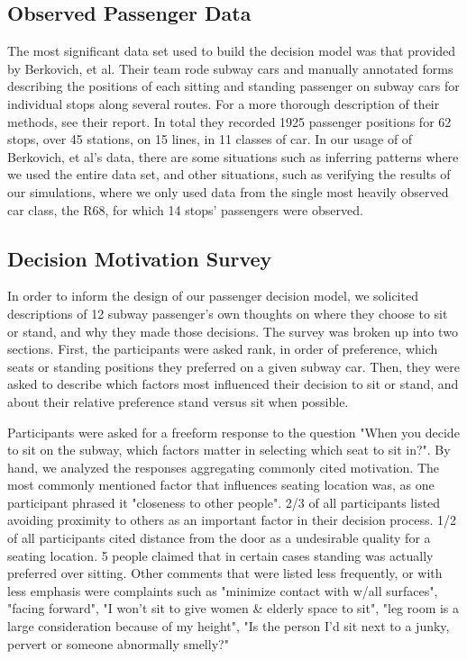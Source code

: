 \documentclass{acm_proc_article-sp}
\begin{document}
\subsection{Observed Passenger Data}
The most significant data set used to build the decision model was that provided by Berkovich, et al. Their team rode subway cars and manually annotated forms describing the positions of each sitting and standing passenger on subway cars for individual stops along several routes. For a more thorough description of their methods, see their report\cite{berkovich2013observed}. In total they recorded 1925 passenger positions for 62 stops, over 45 stations, on 15 lines, in 11 classes of car. In our usage of of Berkovich, et al's data, there are some situations such as inferring patterns where we used the entire data set, and other situations, such as verifying the results of our simulations, where we only used data from the single most heavily observed car class, the R68, for which 14 stops' passengers were observed.

\subsection{Decision Motivation Survey}
In order to inform the design of our passenger decision model, we solicited descriptions of 12 subway passenger's own thoughts on where they choose to sit or stand, and why they made those decisions. The survey was broken up into two sections. First, the participants were asked rank, in order of preference, which seats or standing positions they preferred on a given subway car. Then, they were asked to describe which factors most influenced their decision to sit or stand, and about their relative preference stand versus sit when possible.

Participants were asked for a freeform response to the question "When you decide to sit on the subway, which factors matter in selecting which seat to sit in?". By hand, we analyzed the responses aggregating commonly cited motivation. The most commonly mentioned factor that influences seating location was, as one participant phrased it "closeness to other people". 2/3 of all participants listed avoiding proximity to others as an important factor in their decision process. 1/2 of all participants cited distance from the door as a undesirable quality for a seating location. 5 people claimed that in certain cases standing was actually preferred over sitting. Other comments that were listed less frequently, or with less emphasis were complaints such as "minimize contact with w/all surfaces", "facing forward", "I won't sit to give women \& elderly space to sit", "leg room is a large consideration because of my height", "Is the person I'd sit next to a junky, pervert or someone abnormally smelly?"
\end{document}
